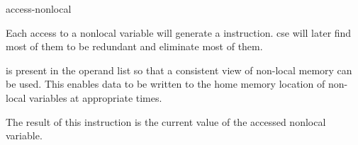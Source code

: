 \begin{instruction}{access-nonlocal}

  \begin{notes}
    Each access to a nonlocal variable will generate a
     instruction.  \ac{cse} will later find most of
    them to be redundant and eliminate most of them.

     is present in the operand list so that a consistent
    view of non-local memory can be used.  This enables data to be
    written to the home memory location of non-local variables at
    appropriate times.
  \end{notes}

  \begin{results}
  \item The result of this instruction is the current value of the
    accessed nonlocal variable.
  \end{results}

  \begin{operands}
  \item {}
  \item {}
  \item {}
  \end{operands}

  \begin{seealso}
  \end{seealso}
\end{instruction}

